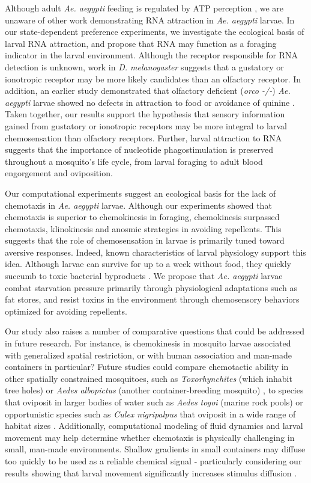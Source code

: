 Although adult \textit{Ae. aegypti} feeding is regulated by ATP perception \cite{Galun1985-we}, we are unaware of other work demonstrating RNA attraction in \textit{Ae. aegypti} larvae. In our state-dependent preference experiments, we investigate the ecological basis of larval RNA attraction, and propose that RNA may function as a foraging indicator in the larval environment. Although the receptor responsible for RNA detection is unknown, work in \textit{D. melanogaster} suggests that a gustatory or ionotropic receptor may be more likely candidates than an olfactory receptor. In addition, an earlier study demonstrated that olfactory deficient (\textit{orco -/-}) \textit{Ae. aegypti} larvae showed no defects in attraction to food or avoidance of quinine \cite{Bui2018-iq}. Taken together, our results support the hypothesis that sensory information gained from gustatory or ionotropic receptors may be more integral to larval chemosensation than olfactory receptors. Further, larval attraction to RNA suggests that the importance of nucleotide phagostimulation is preserved throughout a mosquito's life cycle, from larval foraging to adult blood engorgement and oviposition.

Our computational experiments suggest an ecological basis for the lack of chemotaxis in \textit{Ae. aegypti} larvae. Although our experiments showed that chemotaxis is superior to chemokinesis in foraging, chemokinesis surpassed chemotaxis, klinokinesis and anosmic strategies in avoiding repellents. This suggests that the role of chemosensation in larvae is primarily tuned toward aversive responses. Indeed, known characteristics of larval physiology support this idea. Although larvae can survive for up to a week without food, they quickly succumb to toxic bacterial byproducts \cite{Christophers1960-xf,Floore2006-si}. We propose that \textit{Ae. aegypti} larvae combat starvation pressure primarily through physiological adaptations such as fat stores, and resist toxins in the environment through chemosensory behaviors optimized for avoiding repellents. 

Our study also raises a number of comparative questions that could be addressed in future research. For instance, is chemokinesis in mosquito larvae associated with generalized spatial restriction, or with human association and man-made containers in particular? Future studies could compare chemotactic ability in other spatially constrained mosquitoes, such as \textit{Toxorhynchites} (which inhabit tree holes) or \textit{Aedes albopictus} (another container-breeding mosquito) \cite{Hoel2011-er}, to species that oviposit in larger bodies of water such as \textit{Aedes togoi} (marine rock pools) or opportunistic species such as \textit{Culex nigripalpus} that oviposit in a wide range of habitat sizes \cite{Hoel2011-er,Bentley1989-ct}. Additionally, computational modeling of fluid dynamics and larval movement may help determine whether chemotaxis is physically challenging in small, man-made environments. Shallow gradients in small containers may diffuse too quickly to be used as a reliable chemical signal - particularly considering our results showing that larval movement significantly increases stimulus diffusion \cite{Hein2016-in}. 

